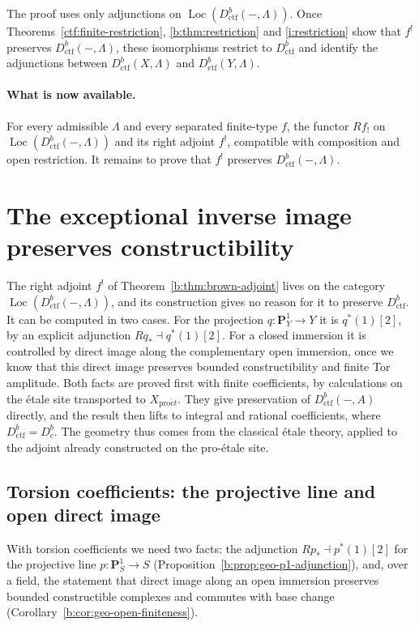 \documentclass[11pt,a4paper]{article}
\numberwithin{equation}{section}
\theoremstyle{definition}
\theoremstyle{remark}
\newcommand{\Dbc}{D^b_c}
\newcommand{\Loc}{\operatorname{Loc}}
\newcommand{\proet}{\mathrm{pro}\acute{e}t}
\newcommand{\Dctf}{D^b_{\mathrm{ctf}}}
\begin{document}
The proof uses only adjunctions on $\Loc(\Dctf(-,\Lambda))$. Once
Theorems~\ref{ctf:finite-restriction}, \ref{b:thm:restriction} and
\ref{i:restriction} show that $f^!$ preserves $\Dctf(-,\Lambda)$,
these isomorphisms restrict to $\Dctf$ and identify the adjunctions
between $\Dctf(X,\Lambda)$ and $\Dctf(Y,\Lambda)$.

\paragraph*{What is now available.} For every admissible $\Lambda$ and every
separated finite-type $f$, the functor $Rf_!$ on $\Loc(\Dctf(-,\Lambda))$
and its right adjoint $f^!$, compatible with composition and open
restriction. It remains to prove that $f^!$ preserves
$\Dctf(-,\Lambda)$.

\section{The exceptional inverse image preserves constructibility}
\label{sec:restriction-chapter}
The right adjoint $f^!$ of Theorem~\ref{b:thm:brown-adjoint} lives on the
category $\Loc(\Dctf(-,\Lambda))$, and its construction gives no
reason for it to preserve $\Dctf$. It can be computed in two cases. For
the projection $q:\mathbf P^1_Y\to Y$ it is $q^*(1)[2]$, by an explicit
adjunction $Rq_*\dashv q^*(1)[2]$. For a closed immersion it is
controlled by direct image along the complementary open immersion, once
we know that this direct image preserves bounded constructibility and
finite Tor amplitude. Both facts are proved first with finite
coefficients, by calculations on the \'etale site transported to
$X_{\proet}$. They give preservation of $\Dctf(-,A)$ directly, and the
result then lifts to integral and rational coefficients, where
$\Dctf=\Dbc$. The geometry thus comes from the classical \'etale theory,
applied to the adjoint already constructed on the pro-\'etale site.

\subsection{Torsion coefficients: the projective line and open direct image}
\label{b:sec:finite-geometric}

With torsion coefficients we need two facts: the adjunction
\(Rp_*\dashv p^*(1)[2]\) for the projective line
\(p:\mathbf P^1_S\to S\) (Proposition~\ref{b:prop:geo-p1-adjunction}),
and, over a field, the statement that direct image along an open
immersion preserves bounded constructible complexes and commutes with
base change (Corollary~\ref{b:cor:geo-open-finiteness}).
\end{document}
